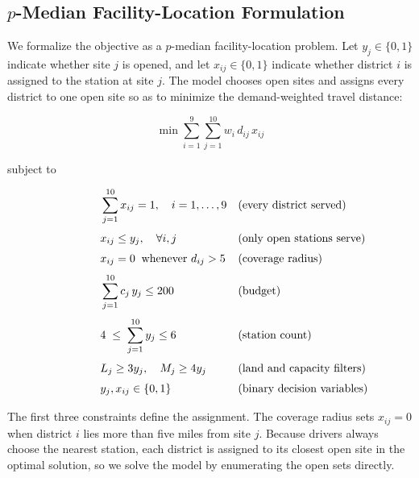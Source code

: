\documentclass[11pt]{article}
\begin{document}
\subsection{$p$-Median Facility-Location Formulation}

We formalize the objective as a $p$-median facility-location problem. Let $y_j \in \{0,1\}$ indicate whether site $j$ is opened, and let $x_{ij} \in \{0,1\}$ indicate whether district $i$ is assigned to the station at site $j$. The model chooses open sites and assigns every district to one open site so as to minimize the demand-weighted travel distance:

\begin{equation}
\min \sum_{i=1}^{9}\sum_{j=1}^{10} w_i \, d_{ij} \, x_{ij}
\end{equation}

subject to

\begin{align}
  & \hspace{1.5cm} \sum_{j=1}^{10} x_{ij} = 1, \quad i = 1,\ldots,9 && \text{(every district served)} \\[3pt]
  & \hspace{1.5cm} x_{ij} \le y_j, \quad \forall i,j && \text{(only open stations serve)} \\[3pt]
  & \hspace{1.5cm} x_{ij} = 0 \;\; \text{whenever } d_{ij} > 5 && \text{(coverage radius)} \\[3pt]
  & \hspace{1.5cm} \sum_{j=1}^{10} c_j \, y_j \le 200 && \text{(budget)} \\[3pt]
  & \hspace{1.5cm} 4 \;\le\; \sum_{j=1}^{10} y_j \le 6 && \text{(station count)} \\[3pt]
  & \hspace{1.5cm} L_j \ge 3 y_j, \quad M_j \ge 4 y_j && \text{(land and capacity filters)} \\[3pt]
  & \hspace{1.5cm} y_j, x_{ij} \in \{0,1\} && \text{(binary decision variables)}
\end{align}

The first three constraints define the assignment. The coverage radius sets $x_{ij} = 0$ when district $i$ lies more than five miles from site $j$. Because drivers always choose the nearest station, each district is assigned to its closest open site in the optimal solution, so we solve the model by enumerating the open sets directly.
\end{document}
